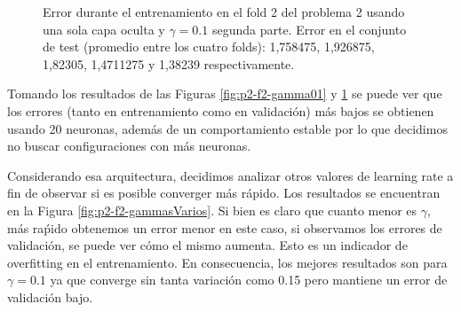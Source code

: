 \documentclass[informe.tex]{subfiles}
\begin{document}
\begin{figure}[H]
        \caption{Error durante el entrenamiento en el fold 2 del problema 2 usando una sola capa oculta y $\gamma=0.1$ segunda parte. Error en el conjunto de test (promedio entre los cuatro folds): 1,758475, 1,926875, 1,82305, 1,4711275 y 1,38239 respectivamente.}\label{fig:p2-f2-gamma01-segundaParte}
    \end{figure}
    
    
    Tomando los resultados de las Figuras \ref{fig:p2-f2-gamma01} y \ref{fig:p2-f2-gamma01-segundaParte} se puede ver que los errores (tanto en entrenamiento como en validaci\'on) m\'as bajos se obtienen usando 20 neuronas, además de un comportamiento estable por lo que decidimos no buscar configuraciones con más neuronas.
    
    Considerando esa arquitectura, decidimos analizar otros valores de learning rate a fin de observar si es posible converger más rápido. Los resultados se encuentran en la Figura \ref{fig:p2-f2-gammasVarios}. Si bien es claro que cuanto menor es $\gamma$, más raṕido obtenemos un error menor en este caso, si observamos los errores de validación, se puede ver cómo el mismo aumenta. Esto es un indicador de overfitting en el entrenamiento. En consecuencia, los mejores resultados son para $\gamma=0.1$ ya que converge sin tanta variaci\'on como 0.15 pero mantiene un error de validaci\'on bajo.
    
\end{document}
